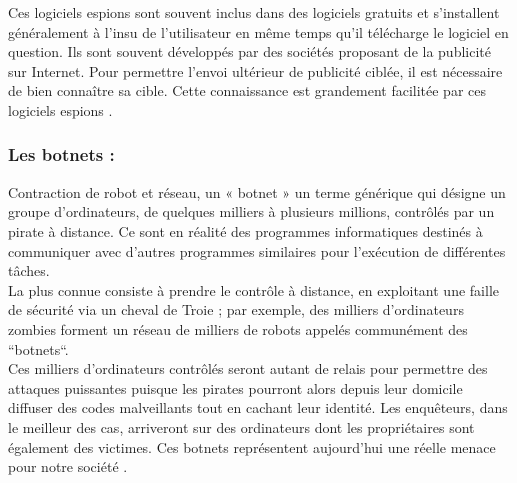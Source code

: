 Ces logiciels espions sont souvent inclus dans des logiciels gratuits et s’installent généralement à l’insu de l’utilisateur en même temps qu’il télécharge le logiciel en question. Ils sont souvent développés par des sociétés proposant de la publicité sur Internet. Pour permettre l’envoi ultérieur de publicité ciblée, il est nécessaire de bien connaître sa cible. Cette connaissance est grandement facilitée par ces logiciels espions \cite{ref13}.
\subsubsection{Les botnets : }
Contraction de robot et réseau, un « botnet » un terme générique qui désigne un groupe d’ordinateurs, de quelques milliers à plusieurs millions, contrôlés par un pirate à distance. Ce sont en réalité des programmes informatiques destinés à communiquer avec d’autres programmes similaires pour l’exécution de différentes tâches.\\
La plus connue consiste à prendre le contrôle à distance, en exploitant une faille de sécurité via un cheval de Troie ; par exemple, des milliers d’ordinateurs zombies forment un réseau de milliers de robots appelés communément des “botnets“.\\
Ces milliers d’ordinateurs contrôlés seront autant de relais pour permettre des attaques puissantes puisque les pirates pourront alors depuis leur domicile diffuser des codes malveillants tout en cachant leur identité. Les enquêteurs, dans le meilleur des cas, arriveront sur des ordinateurs dont les propriétaires sont également des victimes. Ces botnets représentent aujourd’hui une réelle menace pour notre société \cite{ref13}.
